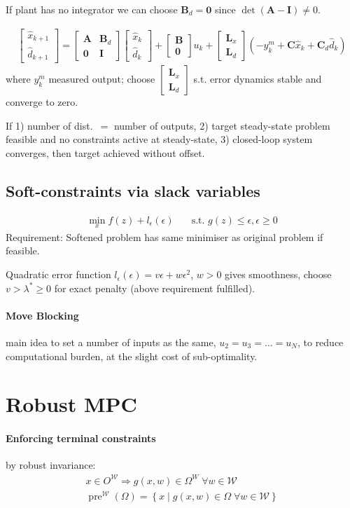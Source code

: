 \documentclass[landscape,a4paper,8pt]{scrartcl}
\renewcommand{\implies}{\Rightarrow}
\newcommand{\mc}[1]{\mathcal{#1}}
\newcommand\vA{\bm{A}}
\newcommand\vB{\bm{B}}
\newcommand\vC{\bm{C}}
\newcommand\vI{\bm{I}}
\newcommand\vL{\bm{L}}
\newcommand{\Me}[1]{\begin{bmatrix}#1\end{bmatrix}} %
\DeclareMathOperator\pre{pre}
\begin{document}
\begin{multicols*}{3}
If plant has no integrator we can choose $\vB_d = \bm 0$ since $\det(\vA-\vI) \neq 0$.

\begin{align*}
\Me{\hat x_{k+1} \\ \hat d_{k+1}} = \Me{\vA & \vB_d \\ \bm 0 & \vI}\Me{\hat x_k \\ \hat d_k} + \Me{\vB \\ \bm 0}u_k + \Me{\vL_x \\ \vL_d}\left(-y_k^m + \vC\hat x_k + \vC_d \hat d_k\right)
\end{align*}
where $y_k^m$ measured output; choose $\Me{\vL_x \\ \vL_d}$ s.t. error dynamics stable and converge to zero.

If 1) number of dist.\ $=$ number of outputs, 2) target steady-state problem feasible and no constraints active at steady-state, 3) closed-loop system converges, then target achieved without offset.


\subsection{Soft-constraints via slack variables}
\begin{align*}
\min_x f(z) + l_\epsilon(\epsilon) & \quad \text{s.t.\ } g(z) \leq \epsilon, \epsilon \geq 0
\end{align*}
Requirement: Softened problem has same minimiser as original problem if feasible.

Quadratic error function $l_\epsilon(\epsilon) = v\epsilon + w\epsilon^2$, $w > 0$ gives smoothness, choose $v > \lambda^* \geq 0$ for exact penalty (above requirement fulfilled).

\paragraph{Move Blocking} main idea to set a number of inputs as the same, $u_2 = u_3 = \dots = u_N$, to reduce computational burden, at the slight cost of sub-optimality.

\section{Robust MPC}
\paragraph{Enforcing terminal constraints} by robust invariance:
\begin{align*}
x \in O^{\mc W} \implies g(x, w) \in \Omega^W \; \forall w \in \mc W \\
\pre^{\mc W}(\Omega) = \left\{ x \middle| g(x, w) \in \Omega \; \forall w \in \mc W\right\}
\end{align*}

\end{multicols*}
\end{document}
